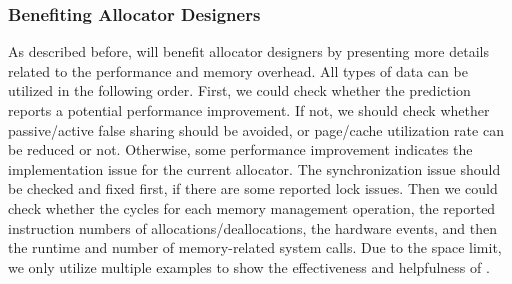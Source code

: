 \subsubsection{Benefiting Allocator Designers}
\label{sec: benifitdesigners}
As described before, \MP{} will benefit allocator designers by presenting more details related to the performance and memory overhead. All types of data can be utilized in the following order. First, we could check whether the prediction reports a potential performance improvement. If not, we should check whether passive/active false sharing should be avoided, or page/cache utilization rate can be reduced or not. Otherwise, some performance improvement indicates the implementation issue for the current allocator. The synchronization issue should be checked and fixed first, if there are some reported lock issues. Then we could check whether the cycles for each memory management operation, the reported instruction numbers of allocations/deallocations, the hardware events, and then the runtime and number of memory-related system calls. Due to the space limit, we only utilize multiple examples to show the effectiveness and helpfulness of \MP{}. 







 







